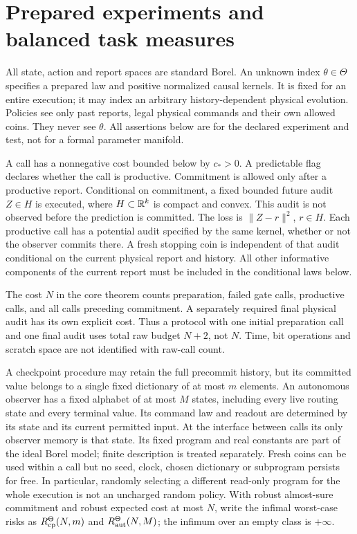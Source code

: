 \section{Prepared experiments and balanced task measures}
\label{sec:experiment}
All state, action and report spaces are standard Borel. An unknown index $\theta\in\Theta$ specifies a prepared law and positive normalized causal kernels. It is fixed for an entire execution; it may index an arbitrary history-dependent physical evolution. Policies see only past reports, legal physical commands and their own allowed coins. They never see $\theta$. All assertions below are for the declared experiment and test, not for a formal parameter manifold.

A call has a nonnegative cost bounded below by $c_*>0$. A predictable flag declares whether the call is productive. Commitment is allowed only after a productive report. Conditional on commitment, a fixed bounded future audit $Z\in H$ is executed, where $H\subset\mathbb R^k$ is compact and convex. This audit is not observed before the prediction is committed. The loss is $\|Z-r\|^2$, $r\in H$. Each productive call has a potential audit specified by the same kernel, whether or not the observer commits there. A fresh stopping coin is independent of that audit conditional on the current physical report and history. All other informative components of the current report must be included in the conditional laws below.

The cost $N$ in the core theorem counts preparation, failed gate calls, productive calls, and all calls preceding commitment. A separately required final physical audit has its own explicit cost. Thus a protocol with one initial preparation call and one final audit uses total raw budget $N+2$, not $N$. Time, bit operations and scratch space are not identified with raw-call count.

A checkpoint procedure may retain the full precommit history, but its committed value belongs to a single fixed dictionary of at most $m$ elements. An autonomous observer has a fixed alphabet of at most $M$ states, including every live routing state and every terminal value. Its command law and readout are determined by its state and its current permitted input. At the interface between calls its only observer memory is that state. Its fixed program and real constants are part of the ideal Borel model; finite description is treated separately. Fresh coins can be used within a call but no seed, clock, chosen dictionary or subprogram persists for free. In particular, randomly selecting a different read-only program for the whole execution is not an uncharged random policy. With robust almost-sure commitment and robust expected cost at most $N$, write the infimal worst-case risks as $R_{\mathrm{cp}}^\Theta(N,m)$ and $R_{\mathrm{aut}}^\Theta(N,M)$; the infimum over an empty class is $+\infty$.

